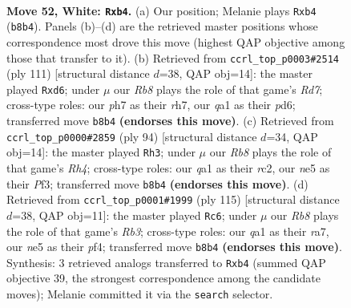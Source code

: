 \documentclass[11pt]{article}
\begin{document}
\clearpage

\begin{figure}[p]\centering
\begin{subfigure}{0.46\textwidth}\centering
\resizebox{\linewidth}{!}{%
\newchessgame
\chessboard[
  setfen={1R6/p1k4p/8/4nr2/1p1p4/8/4P3/qNK5 w - - 2 52},
  showmover=false,
  pgfstyle=straightmove, color=movearrow, markmove={b8-b4}
]}
\caption{}
\end{subfigure}\hfill
\begin{subfigure}{0.46\textwidth}\centering
\resizebox{\linewidth}{!}{%
\newchessgame
\chessboard[
  setfen={1k6/2n1P2R/3P4/8/2K4p/p1P2P2/3r3P/8 b - - 0 56},
  showmover=false,
  pgfstyle=straightmove, color=movearrow, markmove={d2-d6}
]}
\caption{}
\end{subfigure}
\\[4pt]
\begin{subfigure}{0.46\textwidth}\centering
\resizebox{\linewidth}{!}{%
\newchessgame
\chessboard[
  setfen={8/P1n2pk1/2p5/8/1P1K3R/2N2P2/2r4p/8 w - - 3 48},
  showmover=false,
  pgfstyle=straightmove, color=movearrow, markmove={h4-h3}
]}
\caption{}
\end{subfigure}\hfill
\begin{subfigure}{0.46\textwidth}\centering
\resizebox{\linewidth}{!}{%
\newchessgame
\chessboard[
  setfen={8/R3nk2/1r5p/8/5PP1/1P2K3/P7/8 b - - 9 58},
  showmover=false,
  pgfstyle=straightmove, color=movearrow, markmove={b6-c6}
]}
\caption{}
\end{subfigure}
\caption{\textbf{Move 52, White: \texttt{Rxb4}.} (a) Our position; Melanie plays \texttt{Rxb4} (\texttt{b8b4}). Panels (b)--(d) are the retrieved master positions whose correspondence most drove this move (highest QAP objective among those that transfer to it). (b) Retrieved from \texttt{ccrl\_top\_p0003\#2514} (ply 111) [structural distance $d$=38, QAP obj=14]: the master played \texttt{Rxd6}; under $\mu$ our \emph{Rb8} plays the role of that game's \emph{Rd7}; cross-type roles: our \emph{p}h7 as their \emph{r}h7, our \emph{q}a1 as their \emph{p}d6; transferred move \texttt{b8b4} \textbf{(endorses this move)}. (c) Retrieved from \texttt{ccrl\_top\_p0000\#2859} (ply 94) [structural distance $d$=34, QAP obj=14]: the master played \texttt{Rh3}; under $\mu$ our \emph{Rb8} plays the role of that game's \emph{Rh4}; cross-type roles: our \emph{q}a1 as their \emph{r}c2, our \emph{n}e5 as their \emph{P}f3; transferred move \texttt{b8b4} \textbf{(endorses this move)}. (d) Retrieved from \texttt{ccrl\_top\_p0001\#1999} (ply 115) [structural distance $d$=38, QAP obj=11]: the master played \texttt{Rc6}; under $\mu$ our \emph{Rb8} plays the role of that game's \emph{Rb3}; cross-type roles: our \emph{q}a1 as their \emph{r}a7, our \emph{n}e5 as their \emph{p}f4; transferred move \texttt{b8b4} \textbf{(endorses this move)}. Synthesis: 3 retrieved analogs transferred to \texttt{Rxb4} (summed QAP objective 39, the strongest correspondence among the candidate moves); Melanie committed it via the \texttt{search} selector.}
\label{fig:thought-m102}
\end{figure}
\end{document}
